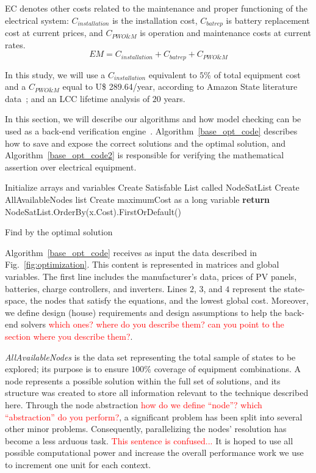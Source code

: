 \documentclass[10pt,journal,compsoc]{IEEEtran}
\begin{document}
EC denotes other costs related to the maintenance and proper functioning of the electrical system: $C_{installation}$ is the installation cost, $C_{batrep}$ is battery replacement cost at current prices, and $C_{PWO\&M}$ is operation and maintenance costs at current rates.
\begin{equation}
\label{eq:EquipamentMaintenence}
EM = C_{installation} + C_{batrep} + C_{PWO\&M}
\end{equation}

In this study, we will use a $C_{installation}$ equivalent to $5$\% of total equipment cost and a $C_{PWO\&M}$ equal to U\$ 289.64/year, according to Amazon State literature data~\cite{Agrener2013}; and an LCC lifetime analysis of $20$ years.

In this section, we will describe our algorithms and how model checking can be used as a back-end verification engine~\cite{DBLP:journals/corr/abs-1909-13139}. Algorithm~\ref{base_opt_code} describes how to save and expose the correct solutions and the optimal solution, and Algorithm~\ref{base_opt_code2} is responsible for verifying the mathematical assertion over electrical equipment.

\begin{algorithm}[ht]
\SetAlgoLined
{}
Initialize arrays and variables\;
Create Satisfable List called NodeSatList\;
Create AllAvailableNodes list\;
Create maximumCost as a long variable\;
\textbf{return} NodeSatList.OrderBy(x.Cost).FirstOrDefault()
\caption{Find by the optimal solution}
\label{base_opt_code}
\end{algorithm}

Algorithm~\ref{base_opt_code} receives as input the data described in Fig.~\ref{fig:optimization}. This content is represented in matrices and global variables. The first line includes the manufacturer's data, prices of PV panels, batteries, charge controllers, and inverters. Lines $2$, $3$, and $4$ represent the state-space, the nodes that satisfy the equations, and the lowest global cost. Moreover, we define design (house) requirements and design assumptions to help the back-end solvers \textcolor{red}{which ones? where do you describe them? can you point to the section where you describe them?}.

\textit{AllAvailableNodes} is the data set representing the total sample of states to be explored; its purpose is to ensure $100$\% coverage of equipment combinations. A node represents a possible solution within the full set of solutions, and its structure was created to store all information relevant to the technique described here. Through the node abstraction \textcolor{red}{how do we define ``node''? which ``abstraction'' do you perform?}, a significant problem has been split into several other minor problems. Consequently, parallelizing the nodes' resolution has become a less arduous task. \textcolor{red}{This sentence is confused...} It is hoped to use all possible computational power and increase the overall performance work we use to increment one unit for each context.
\end{document}
